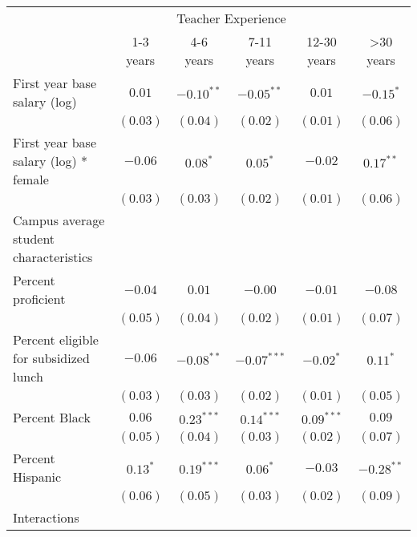 \documentclass[]{article}
\begin{document}
\begin{table}
\begin{center}
\begin{tabular}{l c c c c c }
\hline
 & \multicolumn{4}{c}{Teacher Experience} \\ \cline{2-6}
 & 1-3 years & 4-6 years & 7-11 years & 12-30 years & >30 years \\
\hline
First year base salary (log)                & $0.01$       & $-0.10^{**}$ & $-0.05^{**}$  & $0.01$       & $-0.15^{*}$  \\
                                            & $(0.03)$     & $(0.04)$     & $(0.02)$      & $(0.01)$     & $(0.06)$     \\
First year base salary (log) * female       & $-0.06$      & $0.08^{*}$   & $0.05^{*}$    & $-0.02$      & $0.17^{**}$  \\
                                            & $(0.03)$     & $(0.03)$     & $(0.02)$      & $(0.01)$     & $(0.06)$     \\
Campus average student characteristics      &              &              &               &              &              \\
\quad Percent proficient                    & $-0.04$      & $0.01$       & $-0.00$       & $-0.01$      & $-0.08$      \\
                                            & $(0.05)$     & $(0.04)$     & $(0.02)$      & $(0.01)$     & $(0.07)$     \\
\quad Percent eligible for subsidized lunch & $-0.06$      & $-0.08^{**}$ & $-0.07^{***}$ & $-0.02^{*}$  & $0.11^{*}$   \\
                                            & $(0.03)$     & $(0.03)$     & $(0.02)$      & $(0.01)$     & $(0.05)$     \\
\quad Percent Black                         & $0.06$       & $0.23^{***}$ & $0.14^{***}$  & $0.09^{***}$ & $0.09$       \\
                                            & $(0.05)$     & $(0.04)$     & $(0.03)$      & $(0.02)$     & $(0.07)$     \\
\quad Percent Hispanic                      & $0.13^{*}$   & $0.19^{***}$ & $0.06^{*}$    & $-0.03$      & $-0.28^{**}$ \\
                                            & $(0.06)$     & $(0.05)$     & $(0.03)$      & $(0.02)$     & $(0.09)$     \\
Interactions                                &              &              &               &              &              \\

\end{tabular}
\end{center}
\end{table}
\end{document}
